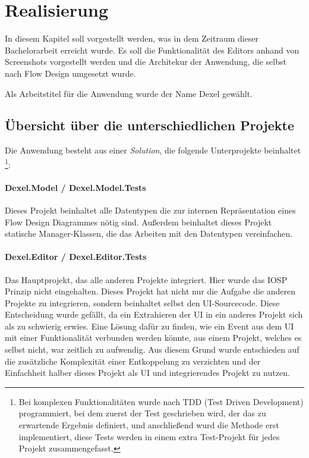 
\chapter{Realisierung }

In diesem Kapitel soll vorgestellt werden, was in dem Zeitraum dieser
Bachelorarbeit erreicht wurde. Es soll die Funktionalität des Editors
anhand von Screenshots vorgestellt werden und die Architekur der Anwendung, die selbst nach
Flow Design umgesetzt wurde. 

Als Arbeitstitel für die Anwendung wurde der Name Dexel gewählt.

\section{Übersicht über die unterschiedlichen Projekte}

Die Anwendung besteht aus einer \textit{Solution}, die folgende Unterprojekte beinhaltet \footnote{Bei komplexen Funktionalitäten wurde nach TDD (Test Driven Development)
programmiert, bei dem zuerst der Test geschrieben wird, der das zu erwartende
Ergebnis definiert, und anschließend wurd die Methode erst implementiert, diese
Tests werden in einem extra Test-Projekt für jedes Projekt zusammengefasst.}:

\subsubsection{Dexel.Model / Dexel.Model.Tests}

Dieses Projekt beinhaltet alle Datentypen die zur internen Repräsentation
eines Flow Design Diagrammes nötig sind. Außerdem beinhaltet dieses Projekt
statische Manager-Klassen, die das Arbeiten mit den Datentypen vereinfachen.

\subsubsection{Dexel.Editor / Dexel.Editor.Tests}

Das Hauptprojekt, das alle anderen Projekte integriert. Hier wurde das IOSP
Prinzip nicht eingehalten. Dieses Projekt hat nicht nur die Aufgabe die
anderen Projekte zu integrieren, sondern beinhaltet selbst den
UI-Sourcecode. Diese Entscheidung wurde gefällt, da ein Extrahieren der UI
in ein anderes Projekt sich als zu schwierig erwies. Eine Lösung dafür zu
finden, wie ein Event aus dem UI mit einer Funktionalität verbunden werden
könnte, aus einem Projekt, welches es selbst nicht, war zeitlich zu
aufwendig. Aus diesem Grund wurde entschieden auf die zusätzliche
Komplexität einer Entkoppelung zu verzichten und der Einfachheit halber
dieses Projekt als UI und integrierendes Projekt zu nutzen.

